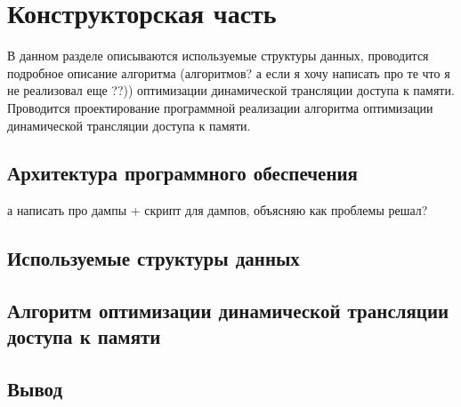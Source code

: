 \section{Конструкторская часть}

В данном разделе описываются используемые структуры данных, проводится
подробное описание алгоритма (алгоритмов? а если я хочу написать про те что я не реализовал еще ??)) оптимизации динамической трансляции доступа к памяти. Проводится проектирование программной реализации алгоритма оптимизации динамической трансляции доступа к памяти.

\subsection{Архитектура программного обеспечения}

а написать про дампы + скрипт для дампов, объясняю как проблемы решал?

\subsection{Используемые структуры данных}

\subsection{Алгоритм оптимизации динамической трансляции доступа к памяти}

\subsection{Вывод}

\pagebreak